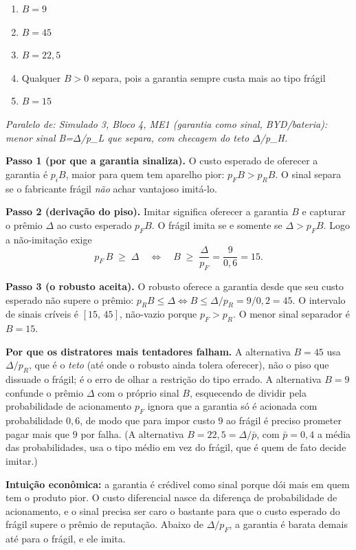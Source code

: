 \begin{enumerate}[label=\Alph*., leftmargin=3.2em, itemsep=0.15em, topsep=0.2em]
  \item $B = 9$
  \item $B = 45$
  \item $B = 22{,}5$
  \item Qualquer $B>0$ separa, pois a garantia sempre custa mais ao tipo fr\'agil
  \item $B = 15$
\end{enumerate}
\begin{solucao}
{\footnotesize\textit{Paralelo de: Simulado 3, Bloco 4, ME1 (garantia como sinal, BYD/bateria): menor sinal B=$\Delta$/p\_L que separa, com checagem do teto $\Delta$/p\_H.}}\par\vspace{0.2em}
\textbf{Passo 1 (por que a garantia sinaliza).} O custo esperado de oferecer a garantia \'e $p_i B$, maior para quem tem aparelho pior: $p_F B > p_R B$. O sinal separa se o fabricante fr\'agil \emph{n\~ao} achar vantajoso imit\'a-lo.

\textbf{Passo 2 (deriva\c{c}\~ao do piso).} Imitar significa oferecer a garantia $B$ e capturar o pr\^emio $\Delta$ ao custo esperado $p_F B$. O fr\'agil imita se e somente se $\Delta > p_F B$. Logo a n\~ao-imita\c{c}\~ao exige
\[
p_F\,B \;\ge\; \Delta \quad\Longleftrightarrow\quad B \;\ge\; \frac{\Delta}{p_F} = \frac{9}{0{,}6} = 15.
\]

\textbf{Passo 3 (o robusto aceita).} O robusto oferece a garantia desde que seu custo esperado n\~ao supere o pr\^emio: $p_R B \le \Delta \Leftrightarrow B \le \Delta/p_R = 9/0{,}2 = 45$. O intervalo de sinais cr\'iveis \'e $[15,\,45]$, n\~ao-vazio porque $p_F > p_R$. O menor sinal separador \'e $B = 15$.

\textbf{Por que os distratores mais tentadores falham.} A alternativa $B = 45$ usa $\Delta/p_R$, que \'e o \emph{teto} (at\'e onde o robusto ainda tolera oferecer), n\~ao o piso que dissuade o fr\'agil; \'e o erro de olhar a restri\c{c}\~ao do tipo errado. A alternativa $B = 9$ confunde o pr\^emio $\Delta$ com o pr\'oprio sinal $B$, esquecendo de dividir pela probabilidade de acionamento $p_F$ \textemdash{} ignora que a garantia s\'o \'e acionada com probabilidade $0{,}6$, de modo que para impor custo $9$ ao fr\'agil \'e preciso prometer pagar mais que $9$ por falha. (A alternativa $B = 22{,}5 = \Delta/\bar p$, com $\bar p = 0{,}4$ a m\'edia das probabilidades, usa o tipo m\'edio em vez do fr\'agil, que \'e quem de fato decide imitar.)

\textbf{Intui\c{c}\~ao econ\^omica:} a garantia \'e cr\'edivel como sinal porque d\'oi mais em quem tem o produto pior. O custo diferencial nasce da diferen\c{c}a de probabilidade de acionamento, e o sinal precisa ser caro o bastante para que o custo esperado do fr\'agil supere o pr\^emio de reputa\c{c}\~ao. Abaixo de $\Delta/p_F$, a garantia \'e barata demais at\'e para o fr\'agil, e ele imita.
\end{solucao}

